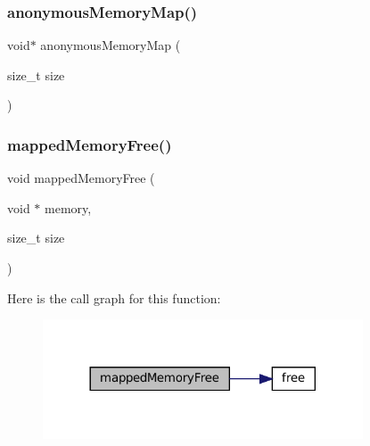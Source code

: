 \subsubsection{\texorpdfstring{anonymous\+Memory\+Map()}{anonymousMemoryMap()}}
{\footnotesize\ttfamily void$\ast$ anonymous\+Memory\+Map (\begin{DoxyParamCaption}\item[{size\+\_\+t}]{size }\end{DoxyParamCaption})}

\mbox{\label{wii-memory_8c_a3542970c4da761e3d6985de6d36d83d3}} 
\subsubsection{\texorpdfstring{mapped\+Memory\+Free()}{mappedMemoryFree()}}
{\footnotesize\ttfamily void mapped\+Memory\+Free (\begin{DoxyParamCaption}\item[{void $\ast$}]{memory,  }\item[{size\+\_\+t}]{size }\end{DoxyParamCaption})}

Here is the call graph for this function\+:
\nopagebreak
\begin{figure}[H]
\begin{center}
\leavevmode
\includegraphics[width=269pt]{wii-memory_8c_a3542970c4da761e3d6985de6d36d83d3_cgraph}
\end{center}
\end{figure}
